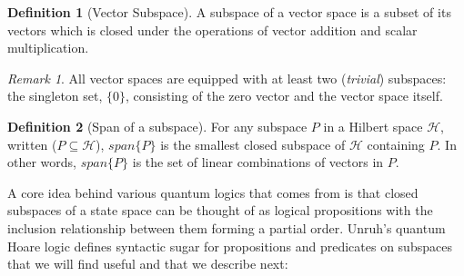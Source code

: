 \documentclass[adraft,creativecommons]{eptcs}
\theoremstyle{definition}
\newtheorem{definition}{Definition}[section]
\theoremstyle{remark}
\newtheorem*{remark}{Remark}
\begin{document}
\begin{definition}[Vector Subspace]
	A subspace of a vector space is a subset of its vectors which is closed under the operations of vector addition and scalar multiplication.
\end{definition}

\begin{remark}
    All vector spaces are equipped with at least two (\textit{trivial}) subspaces: the singleton set, $\{ 0 \}$, consisting of the zero vector and the vector space itself.
\end{remark}

\begin{definition}[Span of a subspace]
	For any subspace $P$ in a Hilbert space $\mathcal{H}$, written ($P \subseteq \mathcal{H}$), $\mathit{span}\{P\}$ is the smallest closed subspace of $\mathcal{H}$ containing $P$. In other words, $\mathit{span}\{P\}$ is the set of linear combinations of vectors in $P$.
\end{definition}

A core idea behind various quantum logics that comes from \textcite{logicqm36} is that closed subspaces of a state space can be thought of as logical propositions with the inclusion relationship between them forming a partial order. Unruh's quantum Hoare logic defines syntactic sugar for propositions and predicates on subspaces that we will find useful and that we describe next:
\end{document}
